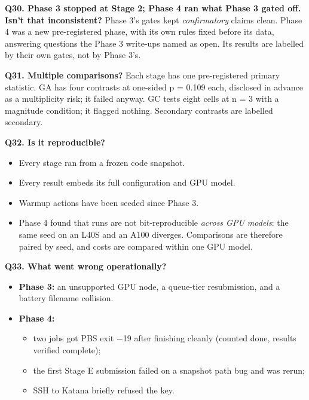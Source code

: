 \documentclass[11pt]{article}
\begin{document}
\textbf{Q30. Phase 3 stopped at Stage 2; Phase 4 ran what Phase 3 gated off. Isn't that inconsistent?} Phase 3's gates kept \emph{confirmatory} claims clean. Phase 4 was a new pre-registered phase, with its own rules fixed before its data, answering questions the Phase 3 write-ups named as open. Its results are labelled by their own gates, not by Phase 3's.



\textbf{Q31. Multiple comparisons?} Each stage has one pre-registered primary statistic. GA has four contrasts at one-sided p = 0.109 each, disclosed in advance as a multiplicity risk; it failed anyway. GC tests eight cells at n = 3 with a magnitude condition; it flagged nothing. Secondary contrasts are labelled secondary.



\textbf{Q32. Is it reproducible?}

\begin{itemize}
\item Every stage ran from a frozen code snapshot.
\item Every result embeds its full configuration and GPU model.
\item Warmup actions have been seeded since Phase 3.
\item Phase 4 found that runs are not bit-reproducible \emph{across GPU models}: the same seed on an L40S and an A100 diverges. Comparisons are therefore paired by seed, and costs are compared within one GPU model.
\end{itemize}



\textbf{Q33. What went wrong operationally?}

\begin{itemize}
\item \textbf{Phase 3:} an unsupported GPU node, a queue-tier resubmission, and a battery filename collision.
\item \textbf{Phase 4:}
\begin{itemize}
\item two jobs got PBS exit $-$19 after finishing cleanly (counted done, results verified complete);
\item the first Stage E submission failed on a snapshot path bug and was rerun;
\item SSH to Katana briefly refused the key.
\end{itemize}
\end{itemize}
\end{document}
